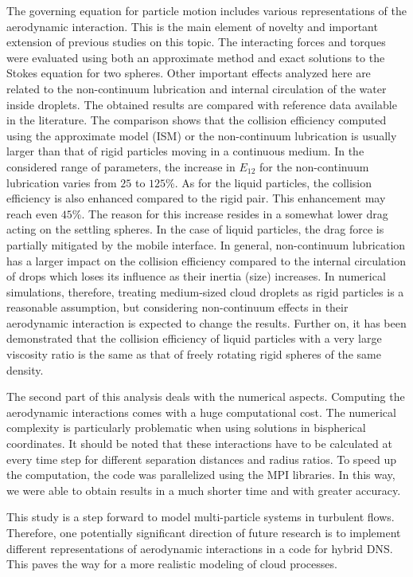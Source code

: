 \documentclass[../thesis.tex]{subfiles}
\begin{document}
The governing equation for particle motion includes various representations of the aerodynamic interaction. This is the main element of novelty and important extension of previous studies on this topic. The interacting forces and torques were evaluated using both an approximate method and exact solutions to the Stokes equation for two spheres. Other important effects analyzed here are related to the non-continuum lubrication and internal circulation of the water inside droplets. The obtained results are compared with reference data available in the literature. The comparison shows that the collision efficiency computed using the approximate model (ISM) or the non-continuum lubrication is usually larger than that of rigid particles moving in a continuous medium. In the considered range of parameters, the increase in $E_{12}$ for the non-continuum lubrication varies from $25$ to $125$\%. As for the liquid particles, the collision efficiency is also enhanced compared to the rigid pair. This enhancement may reach even $45$\%. The reason for this increase resides in a somewhat lower drag acting on the settling spheres. In the case of liquid particles, the drag force is partially mitigated by the mobile interface. In general, non-continuum lubrication has a larger impact on the collision efficiency compared to the internal circulation of drops which loses its influence as their inertia (size) increases. In numerical simulations, therefore, treating medium-sized cloud droplets as rigid particles is a reasonable assumption, but considering non-continuum effects in their aerodynamic interaction is expected to change the results. Further on, it has been demonstrated that the collision efficiency of liquid particles with a very large viscosity ratio is the same as that of freely rotating rigid spheres of the same density. 

The second part of this analysis deals with the numerical aspects. Computing the aerodynamic interactions comes with a huge computational cost. The numerical complexity is particularly problematic when using solutions in bispherical coordinates. It should be noted that these interactions have to be calculated at every time step for different separation distances and radius ratios. To speed up the computation, the code was parallelized using the MPI libraries. In this way, we were able to obtain results in a much shorter time and with greater accuracy.

This study is a step forward to model multi-particle systems in turbulent flows. Therefore, one potentially significant direction of future research is to implement different representations of aerodynamic interactions in a code for hybrid DNS. This paves the way for a more realistic modeling of cloud processes.
\end{document}
